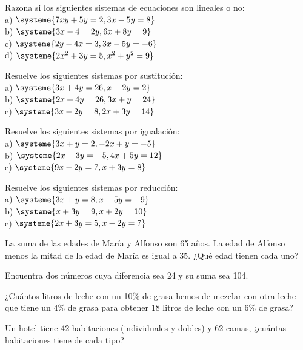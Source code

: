 \begin{ejer}
Razona si los siguientes sistemas de ecuaciones son lineales o no: \\
a) $\systeme{7xy+5y=2, 3x-5y=8}$ \\
b) $\systeme{3x-4=2y, 6x+8y=9}$ \\
c) $\systeme{2y-4x=3, 3x-5y=-6}$ \\
d) $\systeme{2x^2+3y=5, x^2+y^2=9}$ 
\end{ejer}

\begin{ejer}
Resuelve los siguientes sistemas por sustitución: \\
a) $\systeme{3x+4y=26, x-2y=2}$ \\
b) $\systeme{2x+4y=26, 3x+y=24}$ \\
c) $\systeme{3x-2y=8, 2x+3y=14}$ 
\end{ejer}

\begin{ejer}
Resuelve los siguientes sistemas por igualación: \\
a) $\systeme{3x+y=2, -2x+y=-5}$ \\
b) $\systeme{2x-3y=-5, 4x+5y=12}$ \\
c) $\systeme{9x-2y=7, x+3y=8}$ 
\end{ejer}

\begin{ejer}
Resuelve los siguientes sistemas por reducción: \\
a) $\systeme{3x+y=8, x-5y=-9}$ \\
b) $\systeme{x+3y=9, x+2y=10}$ \\
c) $\systeme{2x+3y=5, x-2y=7}$ 
\end{ejer}

\begin{ejer}
La suma de las edades de María y Alfonso son 65 años. La edad de Alfonso menos la mitad de la edad de María es igual a 35. ¿Qué edad tienen cada uno?
\end{ejer}

\begin{ejer}
Encuentra dos números cuya diferencia sea 24 y su suma sea 104.
\end{ejer}

\begin{ejer}
¿Cuántos litros de leche con un 10\% de grasa hemos de mezclar con otra leche que tiene un 4\% de grasa para obtener 18 litros de leche con un 6\% de grasa?
\end{ejer}

\begin{ejer}
Un hotel tiene 42 habitaciones (individuales y dobles) y 62 camas, ¿cuántas habitaciones tiene de cada tipo?
\end{ejer}


